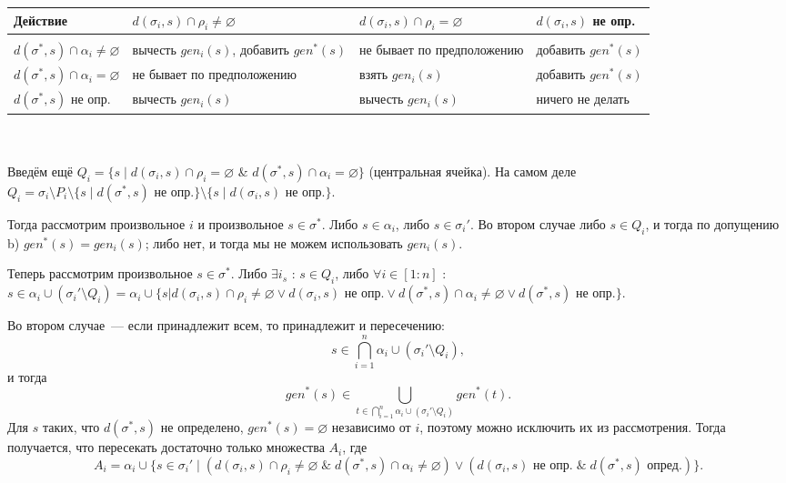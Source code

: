 \begin{tabular}{ | p{3.5cm} || p{3.5cm} | p{3.5cm} | p{3.5cm} |}
	\hline
	Действие & $d(\sigma_i, s) \cap \rho_i \neq \varnothing$ & $d(\sigma_i, s) \cap \rho_i = \varnothing$ & $d(\sigma_i, s)$ не опр. \\ \hline
	& & & \\[-1.1em] \hline
	$d(\sigma^*, s) \cap \alpha_i \neq \varnothing$ & вычесть $gen_i(s)$, добавить $gen^*(s)$ & не бывает по предположению & добавить $gen^*(s)$ \\ \hline
	$d(\sigma^*, s) \cap \alpha_i = \varnothing$ & не бывает по предположению & взять $gen_i(s)$ & добавить $gen^*(s)$ \\ \hline
	$d(\sigma^*, s)$ не опр. & вычесть $gen_i(s)$ & вычесть $gen_i(s)$ & ничего не делать \\
	\hline
\end{tabular} \\\\

Введём ещё $Q_i = \{s \mid d(\sigma_i, s) \cap \rho_i = \varnothing$ \& $d(\sigma^*, s) \cap \alpha_i = \varnothing\}$ (центральная ячейка). На самом деле $Q_i = \sigma_i \setminus P_i \setminus \{s \mid d(\sigma^*, s) \text{ не опр.}\} \setminus \{s \mid d(\sigma_i, s) \text{ не опр.}\}$.

Тогда рассмотрим произвольное $i$ и произвольное $s \in \sigma^*$. Либо $s \in \alpha_i$, либо $s \in \sigma_i'$. Во втором случае либо $s \in Q_i$, и тогда по допущению b) $gen^*(s) =  gen_i(s)$; либо нет, и тогда мы не можем использовать $gen_i(s)$.

Теперь рассмотрим произвольное $s \in \sigma^*$. Либо $\exists i_s$ : $s \in Q_i$, либо $\forall i \in [1:n]$ : $s \in \alpha_i \cup (\sigma_i' \setminus Q_i) = \alpha_i \cup \{s | d(\sigma_i, s) \cap \rho_i \neq \varnothing \vee d(\sigma_i, s) \text{ не опр.} \vee d(\sigma^*, s) \cap \alpha_i \neq \varnothing \vee d(\sigma^*, s) \text{ не опр.} \}$.

Во втором случае~--- если принадлежит всем, то принадлежит и пересечению:
$$s \in \bigcap\limits_{i = 1}^n \alpha_i \cup (\sigma_i' \setminus Q_i),$$
и тогда 
$$gen^*(s) \in \bigcup\limits_{t \in \bigcap\limits_{i = 1}^n \alpha_i \cup (\sigma_i' \setminus Q_i)} gen^*(t).$$
Для $s$ таких, что $d(\sigma^*, s)$ не определено, $gen^*(s) = \varnothing$ независимо от $i$, поэтому можно исключить их из рассмотрения. Тогда получается, что пересекать достаточно только множества $A_i$, где
$$A_i = \alpha_i \cup \{s \in \sigma_i' \mid (d(\sigma_i, s) \cap \rho_i \neq \varnothing \;\&\; d(\sigma^*, s) \cap \alpha_i \neq \varnothing) \vee (d(\sigma_i, s) \text{ не опр.} \;\&\; d(\sigma^*, s) \text{ опред.})\}.$$

